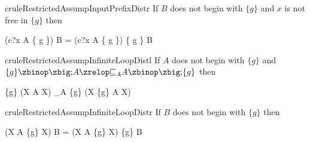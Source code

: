 \begin{minipage}{\textwidth}
\begin{restatable}{crule}{RestrictedAssumpInputPrefixDistr}
  \label{restricted-assump-input-prefix-distr-rule}
  If $B$ does not begin with $\{g\}$ and $x$ is not free in $\{g\}$ then
  \begin{circus}
    (c?x \then A \circseq \{ g \}) \circseq B
    =
    (c?x \then A \circseq \{ g \}) \circseq \{ g \} \circseq B
  \end{circus}
\end{restatable}
\end{minipage}

\begin{minipage}{\textwidth}
\begin{restatable}{crule}{RestrictedAssumpInfiniteLoopDistl}
  \label{restricted-assump-infinite-loop-distl-rule}
  If $A$ does not begin with $\{g\}$ and
  $\{g\} \circseq A \circrefines_A A \circseq \{g\}$ then
  \begin{circus}
    \{g\} \circseq (\circmu X \circspot A \circseq X)
    \circrefines_A
    \{g\} \circseq (\circmu X \circspot \{g\} \circseq A \circseq X)
  \end{circus}
\end{restatable}
\end{minipage}

\begin{minipage}{\textwidth}
\begin{restatable}{crule}{RestrictedAssumpInfiniteLoopDistr}
  \label{restricted-assump-infinite-loop-distr-rule}
  If $B$ does not begin with $\{g\}$ then
  \begin{circus}
    (\circmu X \circspot A \circseq \{g\} \circseq X) \circseq B
    =
    (\circmu X \circspot A \circseq \{g\} \circseq X) \circseq \{g\} \circseq B
  \end{circus}
\end{restatable}
\end{minipage}

